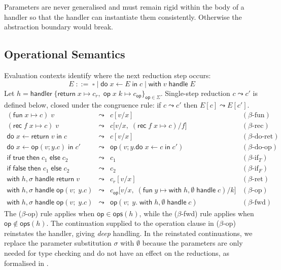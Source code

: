 \documentclass[acmsmall,screen,review,anonymous]{acmart}
\newcommand{\op}{\mathsf{op}}
\newcommand{\ops}{\mathsf{ops}}
\newcommand{\ret}{\mathsf{return}\;}
\newcommand{\ddo}{\mathsf{do}\;}
\newcommand{\iin}{\;\mathsf{in}\;}
\newcommand{\iif}{\mathsf{if}\;}
\newcommand{\then}{\;\mathsf{then}\;}
\newcommand{\eelse}{\;\mathsf{else}\;}
\newcommand{\fun}{\mathsf{fun}\;}
\newcommand{\rec}{\mathsf{rec}\;}
\newcommand{\hhandler}{\mathsf{handler}}
\newcommand{\with}{\mathsf{with}\;}
\newcommand{\handle}{\;\mathsf{handle}\;}
\newcommand{\Sig}{\Sigma}
\begin{document}
Parameters are never generalised and must remain rigid within the body of a handler so that the handler can instantiate them consistently.
Otherwise the abstraction boundary would break.

\subsection{Operational Semantics}

Evaluation contexts identify where the next reduction step occurs:
\[
  E \;::=\; \square
    \mid \ddo x \leftarrow E \iin c
    \mid \with v \handle E
\]
Let $h = \hhandler\;\{\ret x \mapsto c_r,\;\op\;x\;k \mapsto c_\op\}_{\op\in\Sig}$.
Single-step reduction $c \leadsto c'$ is defined below, closed under the congruence rule: if $c \leadsto c'$ then $E[c] \leadsto E[c']$.
\[
\begin{array}{lcll}
  (\fun x \mapsto c)\;v
    & \leadsto & c[v/x]
    & (\beta\text{-fun}) \\
  (\rec f\;x \mapsto c)\;v
    & \leadsto & c\bigl[v/x,\;(\rec f\;x \mapsto c)/f\bigr]
    & (\beta\text{-rec}) \\
  \ddo x \leftarrow \ret v \iin c
    & \leadsto & c[v/x]
    & (\beta\text{-do-ret}) \\
  \ddo x \leftarrow \op(v; y.c) \iin c'
    & \leadsto & \op(v; y.\ddo x \leftarrow c \iin c')
    & (\beta\text{-do-op}) \\
  \iif \mathsf{true} \then c_1 \eelse c_2
    & \leadsto & c_1
    & (\beta\text{-if}_T) \\
  \iif \mathsf{false} \then c_1 \eelse c_2
    & \leadsto & c_2
    & (\beta\text{-if}_F) \\
  \with h, \sigma \handle \ret v
    & \leadsto & c_r[v/x]
    & (\beta\text{-ret}) \\
    \with h,\sigma \handle \op(v;\;y.c)
    & \leadsto & c_\op\bigl[v/x,\;(\fun y \mapsto \with h, \emptyset \handle c)/k\bigr]
    & (\beta\text{-op}) \\
  \with h,\sigma \handle \op(v;\;y.c)
    & \leadsto & \op(v;\;y.\;\with h, \emptyset \handle c)
    & (\beta\text{-fwd})
\end{array}
\]
The ($\beta$-op) rule applies when $\op\in\ops(h)$, while the ($\beta$-fwd) rule applies when $\op \notin\ops(h)$.
The continuation supplied to the operation clause in ($\beta$-op) reinstates the handler, giving \emph{deep} handling.
In the reinstated continuations, we replace the parameter substitution $\sigma$ with $\emptyset$ because the parameters are only needed for
type checking and do not have an effect on the reductions, as formalised in .
\end{document}
